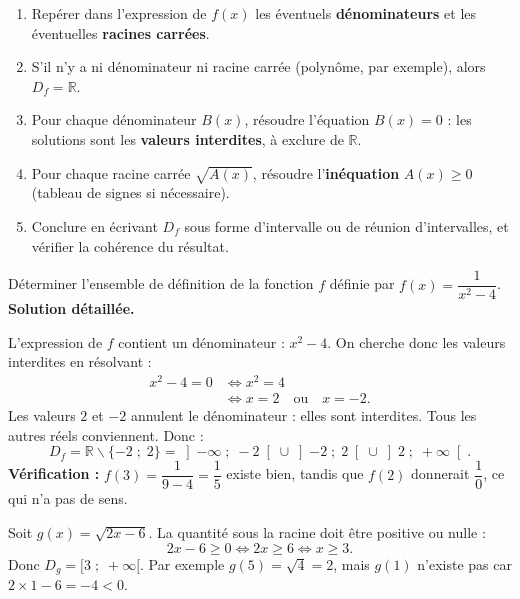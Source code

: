 \documentclass[11pt]{article}
\def\setminus{\mathbin{\backslash}}\let\smallsetminus\setminus
\begin{document}
\begin{methode}
\begin{enumerate}
\item Repérer dans l'expression de $f(x)$ les éventuels \textbf{dénominateurs} et les éventuelles \textbf{racines carrées}.
\item S'il n'y a ni dénominateur ni racine carrée (polynôme, par exemple), alors $D_f = \mathbb{R}$.
\item Pour chaque dénominateur $B(x)$, résoudre l'équation $B(x) = 0$ : les solutions sont les \textbf{valeurs interdites}, à exclure de $\mathbb{R}$.
\item Pour chaque racine carrée $\sqrt{A(x)}$, résoudre l'\textbf{inéquation} $A(x) \geq 0$ (tableau de signes si nécessaire).
\item Conclure en écrivant $D_f$ sous forme d'intervalle ou de réunion d'intervalles, et vérifier la cohérence du résultat.
\end{enumerate}
\end{methode}

\begin{exoresolu}
Déterminer l'ensemble de définition de la fonction $f$ définie par $f(x) = \dfrac{1}{x^2 - 4}$.
\tcblower
\textbf{Solution détaillée.}

L'expression de $f$ contient un dénominateur : $x^2 - 4$. On cherche donc les valeurs interdites en résolvant :
\begin{align*}
x^2 - 4 = 0 &\iff x^2 = 4 \\
&\iff x = 2 \quad \text{ou} \quad x = -2.
\end{align*}
Les valeurs $2$ et $-2$ annulent le dénominateur : elles sont interdites. Tous les autres réels conviennent. Donc :
\[ D_f = \mathbb{R} \setminus \{-2 \; ; \; 2\} = \left]-\infty \; ; \; -2\right[ \cup \left]-2 \; ; \; 2\right[ \cup \left]2 \; ; \; +\infty\right[. \]
\textbf{Vérification :} $f(3) = \dfrac{1}{9-4} = \dfrac{1}{5}$ existe bien, tandis que $f(2)$ donnerait $\dfrac{1}{0}$, ce qui n'a pas de sens.
\end{exoresolu}

\begin{exemplebox}
Soit $g(x) = \sqrt{2x - 6}$. La quantité sous la racine doit être positive ou nulle :
\[ 2x - 6 \geq 0 \iff 2x \geq 6 \iff x \geq 3. \]
Donc $D_g = [3 \; ; \; +\infty[$. Par exemple $g(5) = \sqrt{4} = 2$, mais $g(1)$ n'existe pas car $2 \times 1 - 6 = -4 < 0$.
\end{exemplebox}
\end{document}
